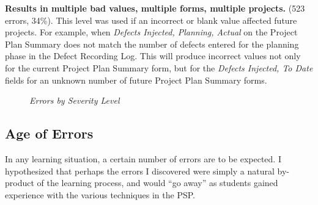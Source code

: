 {\bf Results in multiple bad values, multiple forms, multiple projects.}
(523 errors, 34\%).  This level was used if an incorrect or blank value
affected future projects.  For example, when {\it Defects Injected,
  Planning, Actual} on the Project Plan Summary does not match the number
of defects entered for the planning phase in the Defect Recording Log.
This will produce incorrect values not only for the current Project Plan
Summary form, but for the {\it Defects Injected, To Date} fields for an
unknown number of future Project Plan Summary forms.


\begin{figure}[h] 
    {\centerline{}}
    \caption[Errors by Severity Level]{\label{fig:errorSeverity} 
      {\em Errors by Severity Level}}
\end{figure}


\subsection{\label{section:ErrorAge}Age of Errors}

In any learning situation, a certain number of errors are to be expected.
I hypothesized that perhaps the errors I discovered were simply a natural
by-product of the learning process, and would ``go away'' as students
gained experience with the various techniques in the PSP.

